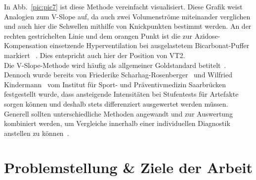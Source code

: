 In Abb.~\ref{pic:pic7} ist diese Methode vereinfacht visualisiert. Diese Grafik weist Analogien zum V-Slope auf, da auch zwei Volumenströme miteinander verglichen und auch hier die Schwellen mithilfe von Knickpunkten bestimmt werden. An der rechten gestrichelten Linie und dem orangen Punkt ist die zur Azidose-Kompensation einsetzende Hyperventilation bei ausgelastetem Bicarbonat-Puffer markiert~\cite{ScharhagRosenberger.2010} . Dies entspricht auch hier der Position von VT2.\\
Die V-Slope-Methode wird häufig als allgemeiner Goldstandard betitelt~\cite{ScharhagRosenberger.2013}. Dennoch wurde bereits von Friederike Scharhag-Rosenberger~\cite{ScharhagRosenberger.2010} und Wilfried Kindermann~\cite{Kindermann.2004} vom Institut für Sport- und Präventivmedizin Saarbrücken festgestellt wurde, dass ansteigende Intensitäten bei Stufentests für Artefakte sorgen können und deshalb stets differenziert ausgewertet werden müssen. Generell sollten unterschiedliche Methoden angewandt und zur Auswertung kombiniert werden, um Vergleiche innerhalb einer individuellen Diagnostik anstellen zu können~\cite{ScharhagRosenberger.2010}.
\section{Problemstellung \& Ziele der Arbeit}

